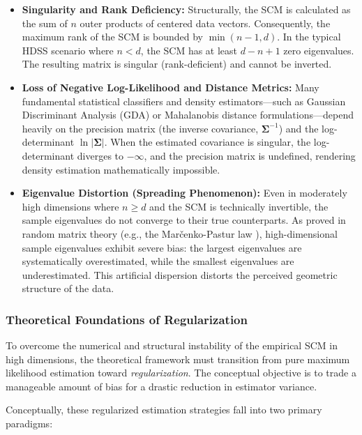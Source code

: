 \begin{itemize}
	\item \textbf{Singularity and Rank Deficiency:} Structurally, the SCM is calculated as the sum of $n$ outer products of centered data vectors. Consequently, the maximum rank of the SCM is bounded by $\min(n-1, d)$. In the typical HDSS scenario where $n < d$, the SCM has at least $d - n + 1$ zero eigenvalues. The resulting matrix is singular (rank-deficient) and cannot be inverted.
	
	\item \textbf{Loss of Negative Log-Likelihood and Distance Metrics:} Many fundamental statistical classifiers and density estimators—such as Gaussian Discriminant Analysis (GDA) or Mahalanobis distance formulations—depend heavily on the precision matrix (the inverse covariance, $\boldsymbol{\Sigma}^{-1}$) and the log-determinant $\ln|\boldsymbol{\Sigma}|$. When the estimated covariance is singular, the log-determinant diverges to $-\infty$, and the precision matrix is undefined, rendering density estimation mathematically impossible.
	
	\item \textbf{Eigenvalue Distortion (Spreading Phenomenon):} Even in moderately high dimensions where $n \ge d$ and the SCM is technically invertible, the sample eigenvalues do not converge to their true counterparts. As proved in random matrix theory (e.g., the Marčenko-Pastur law \cite{MarPas67}), high-dimensional sample eigenvalues exhibit severe bias: the largest eigenvalues are systematically overestimated, while the smallest eigenvalues are underestimated. This artificial dispersion distorts the perceived geometric structure of the data.
\end{itemize}

\subsubsection{Theoretical Foundations of Regularization}

To overcome the numerical and structural instability of the empirical SCM in high dimensions, the theoretical framework must transition from pure maximum likelihood estimation toward \textit{regularization}. The conceptual objective is to trade a manageable amount of bias for a drastic reduction in estimator variance.

Conceptually, these regularized estimation strategies fall into two primary paradigms:


